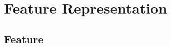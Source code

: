 \documentclass[letterpaper,10pt,english]{sphinxmanual}
\begin{document}
\sphinxstepscope


\section{Feature Representation}
\label{\detokenize{Feature:feature-representation}}\label{\detokenize{Feature::doc}}

\subsection{Feature}
\label{\detokenize{Feature:feature}}
\begin{figure}[htbp]
\centering

\noindent{}
\end{figure}
\end{document}
